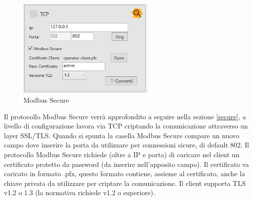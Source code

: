 \begin{figure}[H]
\centering
\includegraphics[width=0.6\textwidth]{../Img/ModBus_Home_Secure.PNG}
\caption[Modbus Secure]{Modbus Secure}
\end{figure}

Il protocollo Modbus Secure verrà approfondito a seguire nella
sezione \ref{secure}, a livello di configurazione lavora via TCP 
criptando la comunicazione attraverso un layer SSL/TLS. Quando si spunta
la casella Modbus Secure compare un nuovo campo dove inserire la porta da utilizzare
per connessioni sicure, di default 802.
Il protocollo Modbus Secure richiede (oltre a IP e porta)
di caricare nel client
un certificato protetto da password (da inserire nell'apposito campo).
Il certificato va caricato in formato .pfx, questo
formato contiene, assieme al certificato, anche 
la chiave privata da utilizzare per criptare la comunicazione.
Il client supporta TLS v1.2 o 1.3 (la normativa richiede v1.2 o superiore).